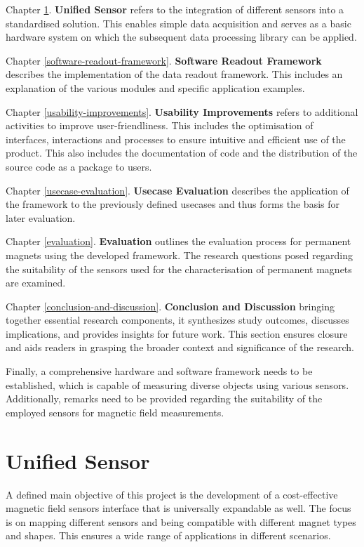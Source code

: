 Chapter \ref{unified-sensor}. \textbf{Unified Sensor} refers to the
integration of different sensors into a standardised solution. This
enables simple data acquisition and serves as a basic hardware system on
which the subsequent data processing library can be applied.

Chapter \ref{software-readout-framework}. \textbf{Software Readout
Framework} describes the implementation of the data readout framework.
This includes an explanation of the various modules and specific
application examples.

Chapter \ref{usability-improvements}. \textbf{Usability Improvements}
refers to additional activities to improve user-friendliness. This
includes the optimisation of interfaces, interactions and processes to
ensure intuitive and efficient use of the product. This also includes
the documentation of code and the distribution of the source code as a
package to users.

Chapter \ref{usecase-evaluation}. \textbf{Usecase Evaluation} describes
the application of the framework to the previously defined usecases and
thus forms the basis for later evaluation.

Chapter \ref{evaluation}. \textbf{Evaluation} outlines the evaluation
process for permanent magnets using the developed framework. The
research questions posed regarding the suitability of the sensors used
for the characterisation of permanent magnets are examined.

Chapter \ref{conclusion-and-discussion}. \textbf{Conclusion and
Discussion} bringing together essential research components, it
synthesizes study outcomes, discusses implications, and provides
insights for future work. This section ensures closure and aids readers
in grasping the broader context and significance of the research.

Finally, a comprehensive hardware and software framework needs to be
established, which is capable of measuring diverse objects using various
sensors. Additionally, remarks need to be provided regarding the
suitability of the employed sensors for magnetic field measurements.

\hypertarget{unified-sensor}{%
\chapter{Unified Sensor}\label{unified-sensor}}

A defined main objective of this project is the development of a
cost-effective magnetic field sensors interface that is universally
expandable as well. The focus is on mapping different sensors and being
compatible with different magnet types and shapes. This ensures a wide
range of applications in different scenarios.

